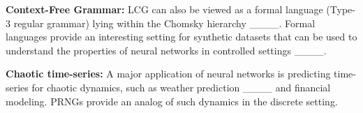 \textbf{Context-Free Grammar:} LCG can also be viewed as a formal language (Type-3 regular grammar) lying within the Chomsky hierarchy ____. Formal languages provide an interesting setting for synthetic datasets that can be used to understand the properties of neural networks in controlled settings ____. 

\textbf{Chaotic time-series:} A major application of neural networks is predicting time-series for chaotic dynamics, such as weather prediction ____ and financial modeling. PRNGs provide an analog of such dynamics in the discrete setting. 

